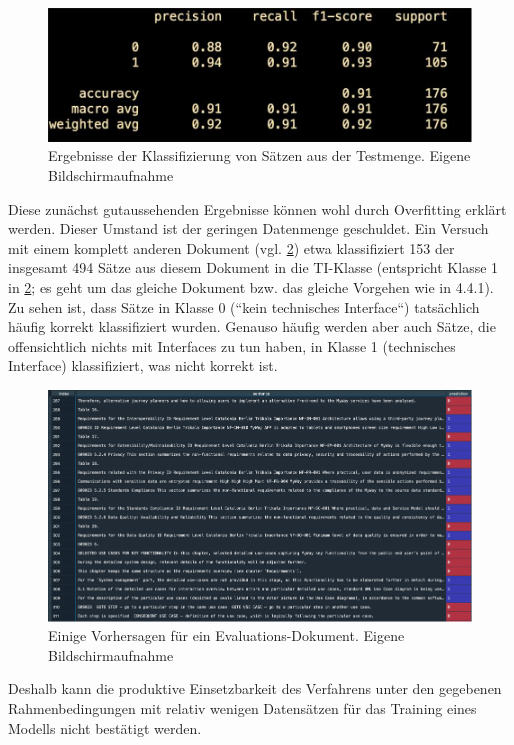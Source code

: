 \begin{figure}[h]
\centering
\includegraphics[scale=0.95]{content/pics/Picture_27.png}
\caption{Ergebnisse der Klassifizierung von Sätzen aus der Testmenge. Eigene Bildschirmaufnahme}
\label{Abbildung:lr-test}
\end{figure}

Diese zunächst gutaussehenden Ergebnisse können wohl durch Overfitting erklärt werden. Dieser Umstand ist der geringen Datenmenge geschuldet. Ein Versuch mit einem komplett anderen Dokument (vgl. \ref{Abbildung:lr-eval}) etwa klassifiziert 153 der insgesamt 494 Sätze aus diesem Dokument in die TI-Klasse (entspricht Klasse 1 in \ref{Abbildung:lr-eval}; es geht um das gleiche Dokument bzw. das gleiche Vorgehen wie in 4.4.1). Zu sehen ist, dass Sätze in Klasse 0 (``kein technisches Interface``) tatsächlich häufig korrekt klassifiziert wurden. Genauso häufig werden aber auch Sätze, die offensichtlich nichts mit Interfaces zu tun haben, in Klasse 1 (technisches Interface) klassifiziert, was nicht korrekt ist.

\begin{figure}[h]
\centering
\includegraphics[scale=0.95]{content/pics/Picture_28.png}
\caption{Einige Vorhersagen für ein Evaluations-Dokument. Eigene Bildschirmaufnahme}
\label{Abbildung:lr-eval}
\end{figure}

Deshalb kann die produktive Einsetzbarkeit des Verfahrens unter den gegebenen Rahmenbedingungen mit relativ wenigen Datensätzen für das Training eines Modells nicht bestätigt werden.

